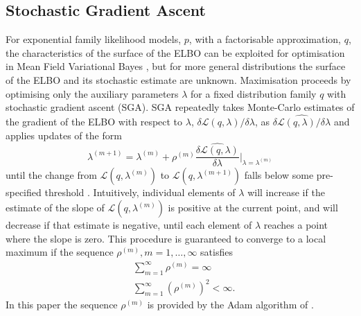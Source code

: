 \documentclass[12pt,a4paper]{article}\usepackage[]{graphicx}\usepackage[]{color}
\begin{document}
\subsection{Stochastic Gradient Ascent}
\label{subsec:SGA}
For exponential family likelihood models, $p$, with a factorisable approximation, $q$, the characteristics of the surface of the ELBO can be exploited for optimisation in Mean Field Variational Bayes \citep{Ghahramani2000, Wainwright2008}, but for more general distributions the surface of the ELBO and its stochastic estimate are unknown. Maximisation proceeds by optimising only the auxiliary parameters $\lambda$ for a fixed distribution family $q$ with stochastic gradient ascent (SGA). SGA repeatedly takes Monte-Carlo estimates of the gradient of the ELBO with respect to $\lambda$, $\delta\mathcal{L}(q, \lambda) / \delta \lambda$, as $\widehat{\delta\mathcal{L}(q, \lambda) / \delta \lambda}$ and applies updates of the form
\begin{equation}
\label{gradientAscent}
\lambda^{(m+1)} = \lambda^{(m)} + \rho^{(m)} \widehat{\frac{\delta\mathcal{L}(q, \lambda)}{\delta \lambda}} \bigg\rvert_{\lambda = \lambda^{(m)}}
\end{equation}
until the change from $\mathcal{L}(q, \lambda^{(m)})$ to $\mathcal{L}(q, \lambda^{(m+1)})$ falls below some pre-specified threshold \citep{Hoffman2013}. Intuitively, individual elements of $\lambda$ will increase if the estimate of the slope of $\mathcal{L}(q, \lambda^{(m)})$ is positive at the current point, and will decrease if that estimate is negative, until each element of $\lambda$ reaches a point where the slope is zero. This procedure is guaranteed to converge to a local maximum \citep{Robbins1951} if the sequence $\rho^{(m)}, m = 1, \dots, \infty$ satisfies
\begin{align}
&\sum_{m=1}^{\infty} \rho^{(m)} =  \infty \\
&\sum_{m=1}^{\infty} (\rho^{(m)})^2 <  \infty.
\end{align}
In this paper the sequence $\rho^{(m)}$ is provided by the Adam algorithm of \citet{Kingma2015b}.
\end{document}
